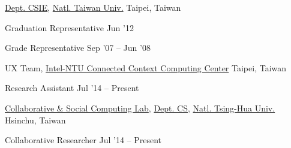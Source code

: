 \documentclass[10pt, a4paper]{article} %
\begin{document}
\spacedhrule{5em}{-1em} %




\headedsection %
{\href{http://www.csie.ntu.edu.tw}{Dept. CSIE}, \href{http://www.ntu.edu.tw}{Natl. Taiwan Univ.}}
{Taipei, Taiwan}
{
	\headedsubsection %
	{Graduation Representative}
	{Jun '12} 
	{}

	\headedsubsection %
	{Grade Representative}
	{Sep '07 -- Jun '08} 
	{}

}




\spacedhrule{1.5em}{-1em} %


\headedsection
{UX Team, \href{http://ccc.ntu.edu.tw/}{Intel-NTU Connected Context Computing Center}}
{Taipei, Taiwan}{

	\headedsubsection
	{Research Assistant}
	{Jul '14 -- Present}
	{}
}


\headedsection
{\href{http://csclab.tw/}{Collaborative \& Social Computing Lab},
 \href{http://www.cs.nthu.edu.tw}{Dept. CS},
 \href{http://www.nthu.edu.tw}{Natl. Tsing-Hua Univ.}}
{Hsinchu, Taiwan}{

	\headedsubsection
	{Collaborative Researcher}
	{Jul '14 -- Present}
	{}
}
\end{document}
